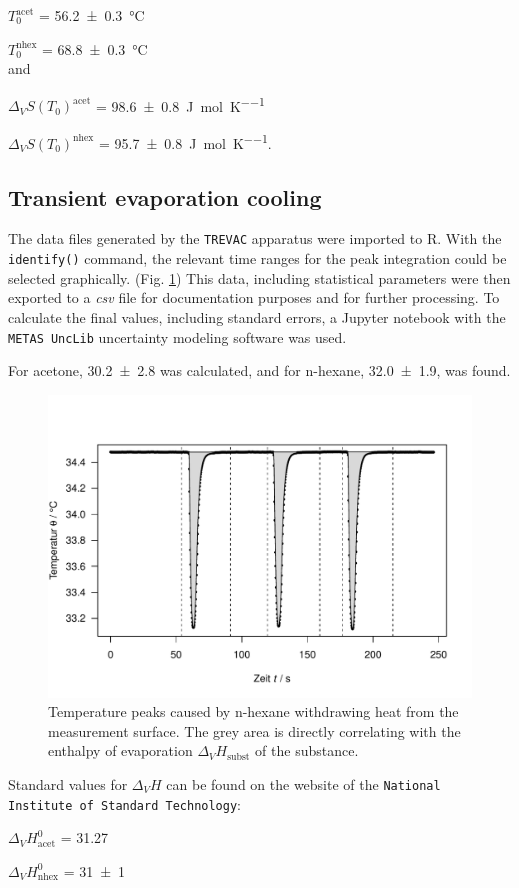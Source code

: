 $T_0^{\text{acet}}$ = \qty{56.2 \pm 0.3}{\celsius} 

$T_0^{\text{nhex}}$ = \qty{68.8 \pm 0.3}{\celsius}
\\and

$\Delta_VS(T_0)^{\text{acet}}$ = \qty{98.6 \pm 0.8}{\joule\per\mole\per\kelvin}

$\Delta_VS(T_0)^{\text{nhex}}$ = \qty{95.7 \pm 0.8}{\joule\per\mole\per\kelvin}.





\subsection{Transient evaporation cooling}
The data files generated by the \texttt{TREVAC} apparatus were imported to R. With the \texttt{identify()} command, the relevant time ranges for the peak integration could be selected graphically. (Fig. \ref{fig:nhex_peaks}) This data, including statistical parameters were then exported to a \textit{csv} file for documentation purposes and for further processing. To calculate the final values, including standard errors, a Jupyter notebook \cite{IPython:2007} with the \texttt{METAS UncLib} uncertainty modeling software \cite{unclib} was used.

For acetone, \qty{30.2 \pm 2.8}{\kJpmole} was calculated, and for n-hexane, \qty{32.0 \pm 1.9}{\kJpmole}, was found.

\begin{figure}[H]
    \centering
    \includegraphics[width=.5\textwidth]{figures/n-hexane.pdf}
    \caption{Temperature peaks caused by n-hexane withdrawing heat from the measurement surface. The grey area is directly correlating with the enthalpy of evaporation $\Delta_VH_{\text{subst}}$ of the substance.}
    \label{fig:nhex_peaks}
\end{figure}

Standard values for $\Delta_VH$ can be found on the website of the \texttt{National Institute of Standard Technology}:

$\Delta_VH^0_{\text{acet}}$ = \qty{31.27}{\kJpmole} \cite{NIST:acet}

$\Delta_VH^0_{\text{nhex}}$ = \qty{31\pm 1}{\kJpmole} \cite{NIST:nhex}

